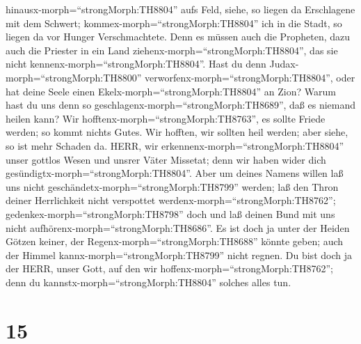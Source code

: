 hinausx-morph=``strongMorph:TH8804'' aufs Feld, siehe, so liegen da
Erschlagene mit dem Schwert; kommex-morph=``strongMorph:TH8804'' ich in
die Stadt, so liegen da vor Hunger Verschmachtete. Denn es müssen auch
die Propheten, dazu auch die Priester in ein Land
ziehenx-morph=``strongMorph:TH8804'', das sie nicht
kennenx-morph=``strongMorph:TH8804''.  Hast du denn
Judax-morph=``strongMorph:TH8800''
verworfenx-morph=``strongMorph:TH8804'', oder hat deine Seele einen
Ekelx-morph=``strongMorph:TH8804'' an Zion? Warum hast du uns denn so
geschlagenx-morph=``strongMorph:TH8689'', daß es niemand heilen kann?
Wir hofftenx-morph=``strongMorph:TH8763'', es sollte Friede werden; so
kommt nichts Gutes. Wir hofften, wir sollten heil werden; aber siehe, so
ist mehr Schaden da.  HERR, wir
erkennenx-morph=``strongMorph:TH8804'' unser gottlos Wesen und unsrer
Väter Missetat; denn wir haben wider dich
gesündigtx-morph=``strongMorph:TH8804''.  Aber um deines
Namens willen laß uns nicht geschändetx-morph=``strongMorph:TH8799''
werden; laß den Thron deiner Herrlichkeit nicht verspottet
werdenx-morph=``strongMorph:TH8762'';
gedenkex-morph=``strongMorph:TH8798'' doch und laß deinen Bund mit uns
nicht aufhörenx-morph=``strongMorph:TH8686''.  Es ist doch
ja unter der Heiden Götzen keiner, der
Regenx-morph=``strongMorph:TH8688'' könnte geben; auch der Himmel
kannx-morph=``strongMorph:TH8799'' nicht regnen. Du bist doch ja der
HERR, unser Gott, auf den wir hoffenx-morph=``strongMorph:TH8762''; denn
du kannstx-morph=``strongMorph:TH8804'' solches alles tun.

\hypertarget{section-14}{%
\section{15}\label{section-14}}

